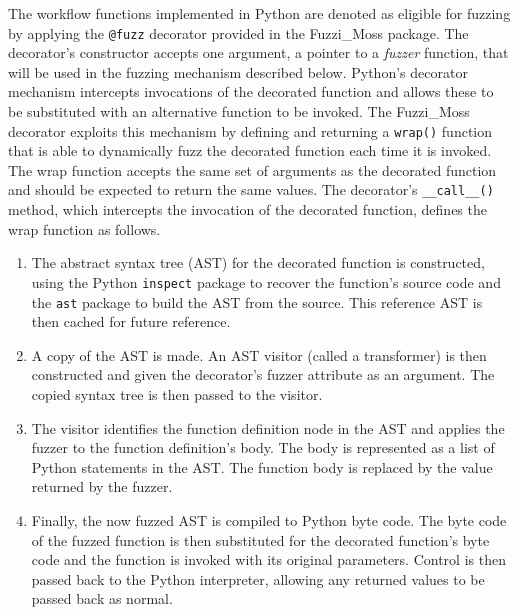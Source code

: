 \documentclass{sig-alternate}
\begin{document}
The workflow functions implemented in Python are denoted as eligible for fuzzing
by applying the \lstinline!@fuzz! decorator provided in the Fuzzi\_Moss
package. The decorator's constructor accepts one argument, a pointer to a
\emph{fuzzer} function, that will be used in the fuzzing mechanism described
below.  Python's decorator mechanism intercepts invocations of the decorated
function and allows these to be substituted with an alternative function to be
invoked.  The Fuzzi\_Moss decorator exploits this mechanism by defining and
returning a \lstinline!wrap()!  function that is able to dynamically fuzz the
decorated function each time it is invoked.  The wrap function accepts the same
set of arguments as the decorated function and should be expected to return the
same values. The decorator's \lstinline!__call__()!  method, which intercepts
the invocation of the decorated function, defines the wrap function as follows.

\begin{enumerate}

\item The abstract syntax tree (AST) for the decorated function is constructed,
  using the Python \lstinline!inspect! package to recover the function's source
  code and the \lstinline!ast!  package to build the AST from the source.  This
  reference AST is then cached for future reference.

\item A copy of the AST is made.  An AST visitor (called a transformer) is then
  constructed and given the decorator's fuzzer attribute as an argument.  The
  copied syntax tree is then passed to the visitor.

\item The visitor identifies the function definition node in the AST and applies
  the fuzzer to the function definition's body.  The body is represented as a
  list of Python statements in the AST.  The function body is replaced by the
  value returned by the fuzzer.

\item Finally, the now fuzzed AST is compiled to Python byte code.  The byte
  code of the fuzzed function is then substituted for the decorated function's
  byte code and the function is invoked with its original parameters.  Control
  is then passed back to the Python interpreter, allowing any returned values to
  be passed back as normal.

\end{enumerate}
\end{document}
